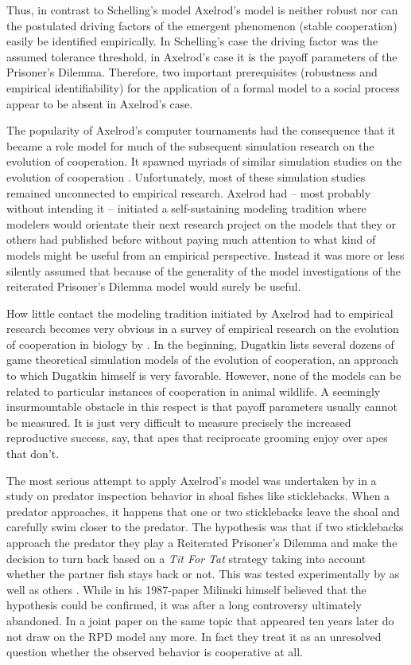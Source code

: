 \documentclass[12pt, english, a4paper]{article}
\begin{document}
Thus, in contrast to Schelling’s model Axelrod’s model is neither
robust nor can the postulated driving factors of the emergent
phenomenon (stable cooperation) easily be identified empirically. In
Schelling’s case the driving factor was the assumed tolerance
threshold, in Axelrod’s case it is the payoff parameters of the
Prisoner’s Dilemma.  Therefore, two important prerequisites
(robustness and empirical identifiability) for the application of a
formal model to a social process appear to be absent in Axelrod’s
case.

The popularity of Axelrod’s computer tournaments had the consequence
that it became a role model for much of the subsequent simulation
research on the evolution of cooperation. It spawned myriads of
similar simulation studies on the evolution of cooperation
\citep{dugatkin:1997, hoffmann:2000}. Unfortunately, most of these
simulation studies remained unconnected to empirical research. Axelrod
had – most probably without intending it – initiated a self-sustaining
modeling tradition where modelers would orientate their next research
project on the models that they or others had published before without
paying much attention to what kind of models might be useful from an
empirical perspective. Instead it was more or less silently assumed
that because of the generality of the model investigations of the
reiterated Prisoner’s Dilemma model would surely be useful.

How little contact the modeling tradition initiated by Axelrod had to
empirical research becomes very obvious in a survey of empirical
research on the evolution of cooperation in biology by
\citet{dugatkin:1997}. In the beginning, Dugatkin lists several dozens
of game theoretical simulation models of the evolution of cooperation,
an approach to which Dugatkin himself is very favorable. However, none
of the models can be related to particular instances of cooperation in
animal wildlife. A seemingly insurmountable obstacle in this respect
is that payoff parameters usually cannot be measured. It is just very
difficult to measure precisely the increased reproductive success,
say, that apes that reciprocate grooming enjoy over apes that don’t.

The most serious attempt to apply Axelrod’s model was undertaken by
\citet{milinski:1987} in a study on predator inspection behavior in
shoal fishes like sticklebacks. When a predator approaches, it happens
that one or two sticklebacks leave the shoal and carefully swim closer
to the predator. The hypothesis was that if two sticklebacks approach
the predator they play a Reiterated Prisoner’s Dilemma and make the
decision to turn back based on a {\em Tit For Tat} strategy taking
into account whether the partner fish stays back or not. This was
tested experimentally by \citet{milinski:1987} as well as others
\citep[59-69]{dugatkin:1998}. While in his 1987-paper Milinski himself
believed that the hypothesis could be confirmed, it was after a long
controversy ultimately abandoned. In a joint paper on the same topic
that appeared ten years later \citet{milinski-parker:1997} do not draw
on the RPD model any more. In fact they treat it as an unresolved
question whether the observed behavior is cooperative at all.
\end{document}
